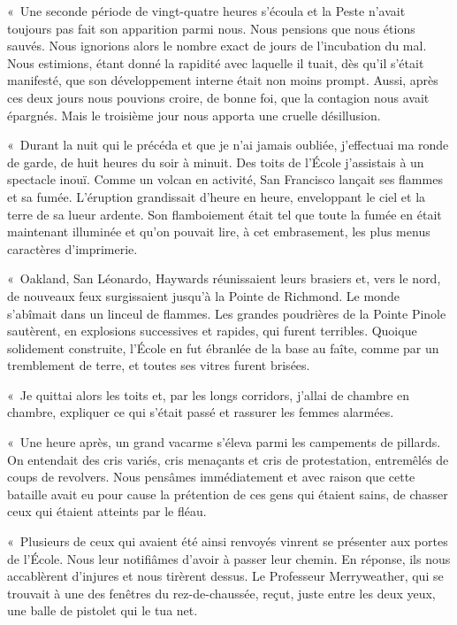 \documentclass[french,twoside]{book} %
\begin{document}
« Une seconde période de vingt-quatre heures s’écoula et la Peste n’avait toujours pas fait son apparition parmi nous. Nous pensions que nous étions sauvés. Nous ignorions alors le nombre exact de jours de l’incubation du mal. Nous estimions, étant donné la rapidité avec laquelle il tuait, dès qu’il s’était manifesté, que son développement interne était non moins prompt. Aussi, après ces deux jours nous pouvions croire, de bonne foi, que la contagion nous avait épargnés. Mais le troisième jour nous apporta une cruelle désillusion.\par
« Durant la nuit qui le précéda et que je n’ai jamais oubliée, j’effectuai ma ronde de garde, de huit heures du soir à minuit. Des toits de l’École j’assistais à un spectacle inouï. Comme un volcan en activité, San Francisco lançait ses flammes et sa fumée. L’éruption grandissait d’heure en heure, enveloppant le ciel et la terre de sa lueur ardente. Son flamboiement était tel que toute la fumée en était maintenant illuminée et qu’on pouvait lire, à cet embrasement, les plus menus caractères d’imprimerie.\par
« Oakland, San Léonardo, Haywards réunissaient leurs brasiers et, vers le nord, de nouveaux feux surgissaient jusqu’à la Pointe de Richmond. Le monde s’abîmait dans un linceul de flammes. Les grandes poudrières de la Pointe Pinole sautèrent, en explosions successives et rapides, qui furent terribles. Quoique solidement construite, l’École en fut ébranlée de la base au faîte, comme par un tremblement de terre, et toutes ses vitres furent brisées.\par
« Je quittai alors les toits et, par les longs corridors, j’allai de chambre en chambre, expliquer ce qui s’était passé et rassurer les femmes alarmées.\par
« Une heure après, un grand vacarme s’éleva parmi les campements de pillards. On entendait des cris variés, cris menaçants et cris de protestation, entremêlés de coups de revolvers. Nous pensâmes immédiatement et avec raison que cette bataille avait eu pour cause la prétention de ces gens qui étaient sains, de chasser ceux qui étaient atteints par le fléau.\par
« Plusieurs de ceux qui avaient été ainsi renvoyés vinrent se présenter aux portes de l’École. Nous leur notifiâmes d’avoir à passer leur chemin. En réponse, ils nous accablèrent d’injures et nous tirèrent dessus. Le Professeur Merryweather, qui se trouvait à une des fenêtres du rez-de-chaussée, reçut, juste entre les deux yeux, une balle de pistolet qui le tua net.\par
\end{document}
